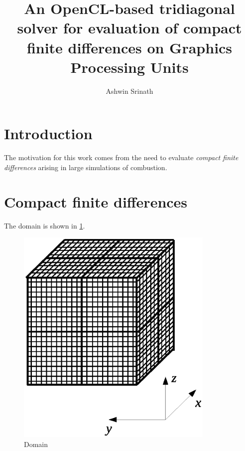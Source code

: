 \documentclass{report}
\author{Ashwin Srinath}
\title{An OpenCL-based tridiagonal solver for evaluation
    of compact finite differences on Graphics Processing Units}
\begin{document}

\section{Introduction}

The motivation for this work comes from the need to evaluate
\emph{compact finite differences} arising in large simulations of
combustion.


\section{Compact finite differences}


The domain is shown in \ref{fig:domain}.

\begin{figure}[h]
\begin{center}
\includegraphics[trim={{100pt} {150pt} {100pt} {150pt}}, clip, height=300pt]{img/domain.eps}
\end{center}
\caption{Domain}
\label{fig:domain}
\end{figure}
\end{document}
